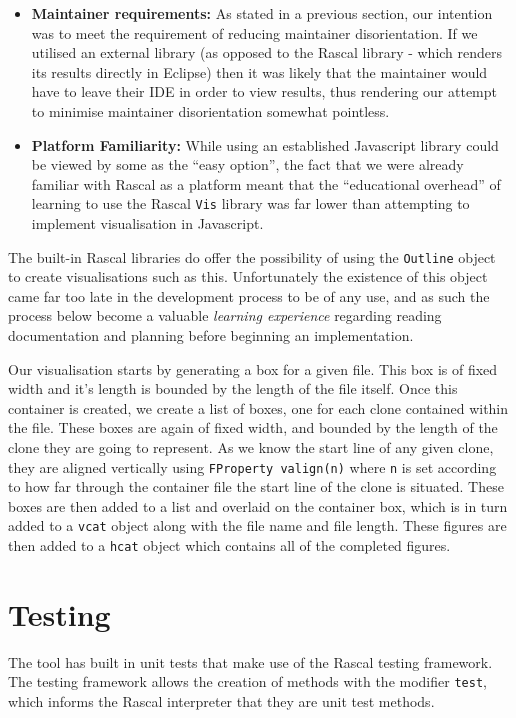 \documentclass{article}
\begin{document}
\begin{itemize}
\item \textbf{Maintainer requirements:} As stated in a previous section, our intention was to meet the requirement of reducing maintainer disorientation. If we utilised an external library (as opposed to the Rascal library - which renders its results directly in Eclipse) then it was likely that the maintainer would have to leave their IDE in order to view results, thus rendering our attempt to minimise maintainer disorientation somewhat pointless.
\item \textbf{Platform Familiarity:} While using an established Javascript library could be viewed by some as the ``easy option'', the fact that we were already familiar with Rascal as a platform meant that the ``educational overhead'' of learning to use the Rascal \texttt{Vis} library was far lower than attempting to implement visualisation in Javascript.
\end{itemize}

The built-in Rascal libraries do offer the possibility of using the \texttt{Outline} object to create visualisations such as this. Unfortunately the existence of this object came far too late in the development process to be of any use, and as such the process below become a valuable \textit{learning experience} regarding reading documentation and planning before beginning an implementation.

Our visualisation starts by generating a box for a given file. This box is of fixed width and it's length is bounded by the length of the file itself. Once this container is created, we create a list of boxes, one for each clone contained within the file. These boxes are again of fixed width, and bounded by the length of the clone they are going to represent. As we know the start line of any given clone, they are aligned vertically using \texttt{FProperty valign(n)} where \texttt{n} is set according to how far through the container file the start line of the clone is situated. These boxes are then added to a list and overlaid on the container box, which is in turn added to a \texttt{vcat} object along with the file name and file length. These figures are then added to a \texttt{hcat} object which contains all of the completed figures.

\section{Testing}

The tool has built in unit tests that make use of the Rascal testing framework. The testing framework allows the creation of methods with the modifier \texttt{test}, which informs the Rascal interpreter that they are unit test methods.
\end{document}
